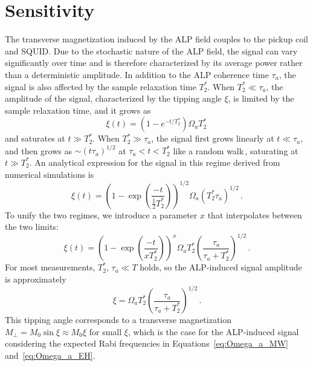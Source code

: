 \section{Sensitivity}\label{sec:experiment:sensitivity}

The transverse magnetization induced by the ALP field couples to the pickup coil and SQUID.
Due to the stochastic nature of the ALP field, the signal can vary significantly over time and is therefore characterized by its average power rather than a deterministic amplitude.
In addition to the ALP coherence time $\tau_a$, the signal is also affected by the sample relaxation time $T_2^*$.
When $T_2^* \ll \tau_a$, the amplitude of the signal, characterized by the tipping angle $\xi$, is limited by the sample relaxation time, and it grows as
\begin{equation}
    \xi(t) = (1 - e^{-t/T_2^*}) \Omega_a T_2^*
    \,
    \label{eq:s_t_T2star_ll_tau_a}
\end{equation}
and saturates at $t\gg T_2^*$.
When $T_2^* \gg \tau_a$, the signal first grows linearly at $t\ll\tau_a$, and then grows as $\sim (t\tau_a)^{1/2}$ at $\tau_a<t<T_2^*$ like a random walk\,\cite{Gramolin2022Feb_SpectralSignatures, Yuzhe2023_FrequencyScanning}, saturating at $t\gg T_2^*$.
An analytical expression for the signal in this regime derived from numerical simulations is
\begin{equation}
    \xi(t) = \left(1 - \exp{\left(\frac{-t}{\frac{1}{2}T_2^*}\right)}\right)^{1/2} \Omega_a \left(T_2^*\tau_a\right)^{1/2}
    \,.\label{eq:xi_t_T2star_gg_tau_a}
\end{equation}
To unify the two regimes, we introduce a parameter $x$ that interpolates between the two limits:
\begin{equation}
    \xi(t) = \left(1 - \exp{\left(\frac{-t}{x T_2^*}\right)}\right)^{x} \Omega_a T_2^* \left(\frac{\tau_a}{\tau_a + T_2^*}\right)^{1/2}
    \,.\label{eq:xi_t_general}
\end{equation}
For most measurements, $T_2^*,\, \tau_a \ll T$ holds, so the ALP-induced signal amplitude is approximately
\begin{equation}
    \xi = \Omega_a T_2^* \left(\frac{\tau_a}{\tau_a + T_2^*}\right)^{1/2}
    \,.\label{eq:xi_final}
\end{equation}
This tipping angle corresponds to a transverse magnetization $M_\perp = M_0 \sin{\xi} \approx M_0 \xi$ for small $\xi$, which is the case for the ALP-induced signal considering the expected Rabi frequencies in Equations~\eqref{eq:Omega_a_MW} and~\eqref{eq:Omega_a_EH}.

